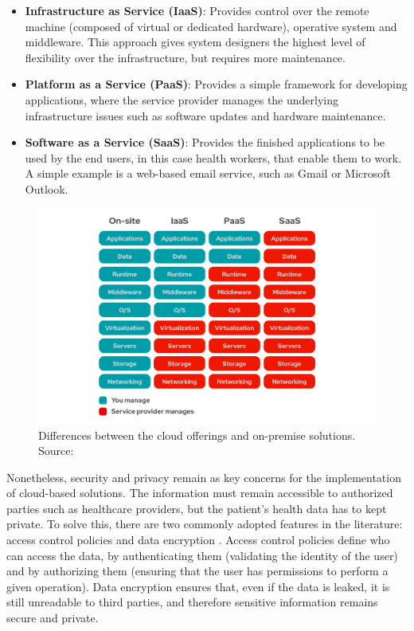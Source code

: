 \begin{itemize}
    \item \textbf{Infrastructure as Service (IaaS)}: Provides control over the remote machine (composed of virtual or dedicated hardware), operative system and middleware. This approach gives system designers the highest level of flexibility over the infrastructure, but requires more maintenance.
    \item \textbf{Platform as a Service (PaaS)}: Provides a simple framework for developing applications, where the service provider manages the underlying infrastructure issues such as software updates and hardware maintenance. 
    \item \textbf{Software as a Service (SaaS)}: Provides the finished applications to be used by the end users, in this case health workers, that enable them to work. A simple example is a web-based email service, such as Gmail or Microsoft Outlook. 
\end{itemize}

\begin{figure}[H]
    \centering
    \includegraphics[width=\linewidth]{images/cloud-services.png}
    \caption[Differences between the cloud offerings and on-premise solutions.]{ Differences between the cloud offerings and on-premise solutions. Source: \cite{RedHat2021}}
    \label{fig:differences-between-cloud-services}
\end{figure}


Nonetheless, security and privacy remain as key concerns for the implementation of cloud-based solutions. The information must remain accessible to authorized parties such as healthcare providers, but the patient's health data has to kept private. To solve this, there are two commonly adopted features in the literature: access control policies and data encryption \cite{Baker2017}. Access control policies define who can access the data, by authenticating them (validating the identity of the user) and by authorizing them (ensuring that the user has permissions to perform a given operation). Data encryption ensures that, even if the data is leaked, it is still unreadable to third parties, and therefore sensitive information remains secure and private. \bigskip


